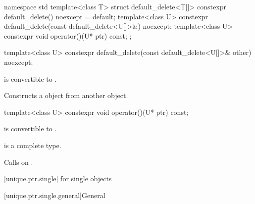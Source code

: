 \begin{codeblock}
namespace std {
  template<class T> struct default_delete<T[]> {
    constexpr default_delete() noexcept = default;
    template<class U> constexpr default_delete(const default_delete<U[]>&) noexcept;
    template<class U> constexpr void operator()(U* ptr) const;
  };
}
\end{codeblock}

\begin{itemdecl}
template<class U> constexpr default_delete(const default_delete<U[]>& other) noexcept;
\end{itemdecl}

\begin{itemdescr}
\pnum
\constraints
{} is convertible to .

\pnum
\effects
Constructs a  object from another  object.
\end{itemdescr}

%
\begin{itemdecl}
template<class U> constexpr void operator()(U* ptr) const;
\end{itemdecl}

\begin{itemdescr}
\pnum
\constraints
{} is convertible to .

\pnum
\mandates
{} is a complete type.

\pnum
\effects
Calls  on .
\end{itemdescr}

[unique.ptr.single]{ for single objects}

[unique.ptr.single.general]{General}

